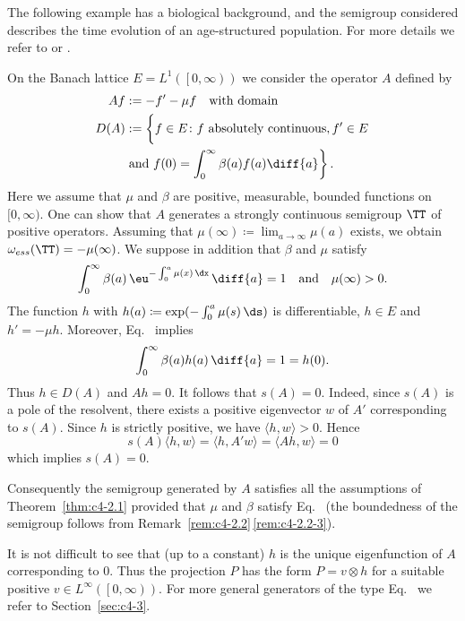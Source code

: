 The following example has a biological background, and the semigroup considered describes the time evolution of an age-structured population.
For more details we refer to \textcite{greiner:1984a} or \textcite{webb:1984}.

\begin{example}\label{ex:c4-2.3}
On the Banach lattice $E = L^{1}( \left[0,\infty\right))$ we consider the operator $A$ defined by
\begin{equation}\label{eq:c4-2.2}
\begin{split}
	Af &:= -f' - \mu f \quad \text{with domain}\\ 
	D(A) &:= \left\{ \vphantom{\int_{0}^{\infty}}f \in E \colon f \text{ absolutely continuous}, f' \in E  \right. \\
	 \qquad & \left. \text{and } f(0) = \int_{0}^{\infty} \beta(a) f(a)  \diff{a} \vphantom{\}} \right\}.
\end{split}
\end{equation}
Here we assume that $\mu$ and $\beta$ are positive, measurable, bounded functions on $[0,\infty)$.
One can show that $A$ generates a strongly continuous semigroup $\TT$ of positive operators.
Assuming that $\mu(\infty) \coloneqq \lim_{a \to \infty}\mu(a)$ exists, we obtain $\omega_{ess}(\TT) = -\mu(\infty)$.
We suppose in addition that $\beta$ and $\mu$ satisfy
\begin{equation}\label{eq:c4-2.3}
\int_{0}^{\infty} \beta(a)\,\eu^{-\int_{0}^{a} \mu(x)\,\dx}\,\diff{a} = 1
\quad \text{and} \quad \mu(\infty) > 0.
\end{equation}
The function $h$ with $h(a) \coloneqq \exp(-\int_{0}^{a} \mu(s) \, \ds)$ is differentiable, $h \in E$ and $h' = -\mu h$.
Moreover, Eq.~ implies 
%
\[
	 \int_{0}^{\infty} \beta(a)h(a) \, \diff{a} = 1 = h(0) .
\]
%
Thus $h \in D(A)$ and $Ah = 0$.
It follows that $s(A) = 0$.
Indeed, since $s(A)$ is a pole of the resolvent, there exists a positive eigenvector $w$ of\/ $A'$ corresponding to $s(A)$.
Since $h$ is strictly positive, we have $\langle h,w \rangle > 0$. 
Hence 
\[
s(A)\langle h,w \rangle = \langle h,A'w \rangle = \langle Ah,w \rangle = 0
\]
which implies $s(A) = 0$.

Consequently the semigroup generated by $A$ satisfies all the assumptions of Theorem~\ref{thm:c4-2.1} provided that $\mu$ and $\beta$ satisfy Eq.~ (the boundedness of the semigroup follows from Remark~\ref{rem:c4-2.2}\,\ref{rem:c4-2.2-3}).

It is not difficult to see that (up to a constant) $h$ is the unique eigenfunction of\/ $A$ corresponding to $0$.
Thus the projection $P$ has the form $P = v \otimes h$ for a suitable positive $v \in L^{\infty}(\left[0,\infty\right))$.
For more general generators of the type Eq.~ we refer to Section~\ref{sec:c4-3}.
\end{example}
